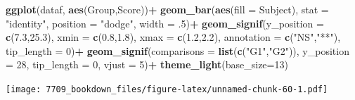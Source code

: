 \documentclass[]{book}
\newenvironment{Shaded}{\begin{snugshade}}{\end{snugshade}}
\newcommand{\DataTypeTok}[1]{\textcolor[rgb]{0.13,0.29,0.53}{#1}}
\newcommand{\DecValTok}[1]{\textcolor[rgb]{0.00,0.00,0.81}{#1}}
\newcommand{\FloatTok}[1]{\textcolor[rgb]{0.00,0.00,0.81}{#1}}
\newcommand{\KeywordTok}[1]{\textcolor[rgb]{0.13,0.29,0.53}{\textbf{#1}}}
\newcommand{\NormalTok}[1]{#1}
\newcommand{\OperatorTok}[1]{\textcolor[rgb]{0.81,0.36,0.00}{\textbf{#1}}}
\newcommand{\StringTok}[1]{\textcolor[rgb]{0.31,0.60,0.02}{#1}}
\begin{document}
\begin{Shaded}
\begin{Highlighting}[]
\KeywordTok{ggplot}\NormalTok{(dataf, }\KeywordTok{aes}\NormalTok{(Group,Score))}\OperatorTok{+}
\StringTok{  }\KeywordTok{geom_bar}\NormalTok{(}\KeywordTok{aes}\NormalTok{(}\DataTypeTok{fill =}\NormalTok{ Subject), }\DataTypeTok{stat =} \StringTok{"identity"}\NormalTok{, }
           \DataTypeTok{position =} \StringTok{"dodge"}\NormalTok{, }\DataTypeTok{width =} \FloatTok{.5}\NormalTok{)}\OperatorTok{+}
\StringTok{  }\KeywordTok{geom_signif}\NormalTok{(}\DataTypeTok{y_position =} \KeywordTok{c}\NormalTok{(}\FloatTok{7.3}\NormalTok{,}\FloatTok{25.3}\NormalTok{), }\DataTypeTok{xmin =} \KeywordTok{c}\NormalTok{(}\FloatTok{0.8}\NormalTok{,}\FloatTok{1.8}\NormalTok{), }
              \DataTypeTok{xmax =} \KeywordTok{c}\NormalTok{(}\FloatTok{1.2}\NormalTok{,}\FloatTok{2.2}\NormalTok{), }\DataTypeTok{annotation =} \KeywordTok{c}\NormalTok{(}\StringTok{"NS"}\NormalTok{,}\StringTok{"**"}\NormalTok{),}
              \DataTypeTok{tip_length =} \DecValTok{0}\NormalTok{)}\OperatorTok{+}
\StringTok{  }\KeywordTok{geom_signif}\NormalTok{(}\DataTypeTok{comparisons =} \KeywordTok{list}\NormalTok{(}\KeywordTok{c}\NormalTok{(}\StringTok{"G1"}\NormalTok{,}\StringTok{"G2"}\NormalTok{)), }\DataTypeTok{y_position =} \DecValTok{28}\NormalTok{,}
              \DataTypeTok{tip_length =} \DecValTok{0}\NormalTok{, }\DataTypeTok{vjust =} \DecValTok{5}\NormalTok{)}\OperatorTok{+}
\StringTok{  }\KeywordTok{theme_light}\NormalTok{(}\DataTypeTok{base_size=}\DecValTok{13}\NormalTok{)}
\end{Highlighting}
\end{Shaded}

\texttt{[image: 7709\_bookdown\_files/figure-latex/unnamed-chunk-60-1.pdf]}


\end{document}
